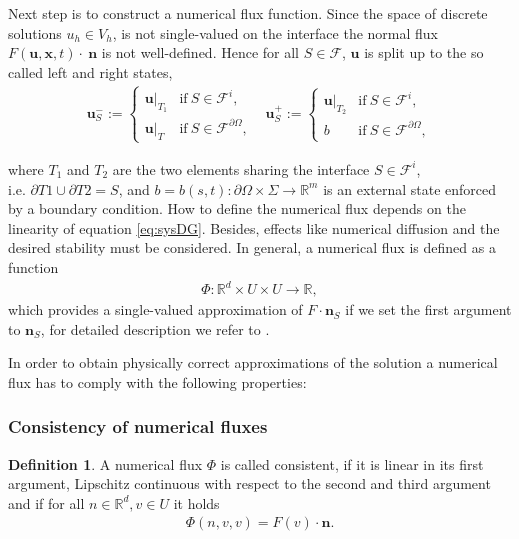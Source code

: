 \documentclass[a4paper,12pt]{article}
\theoremstyle{definition}
\newtheorem{Def}{Definition}
\theoremstyle{definition}
\begin{document}
Next step is to construct a numerical flux function. Since the space of discrete solutions $u_h\in V_h$, is not single-valued on the interface the normal flux $ F(\mathbf{u}, \mathbf{x}, t)\cdot~\mathbf{n} $ is not well-defined.
Hence for all $S \in \mathcal{F}$, $\mathbf{u}$ is split up to the so called left and right states, 
\begin{equation}\label{eq:statesplitting}
\begin{matrix}
\mathbf{u}_S^- := \left\lbrace
\begin{array}{ll}
\mathbf{u}\vert_{T_1} & \mathrm{if}\ S \in \mathcal{F}^i, \\
\mathbf{u}\vert_T & \mathrm{if}\ S \in \mathcal{F}^{\partial \Omega},
\end{array} \right.
& \mathbf{u}_S^+ := \left\lbrace
\begin{array}{ll}
\mathbf{u}\vert_{T_2} & \mathrm{if}\ S \in \mathcal{F}^i, \\
b & \mathrm{if}\ S \in \mathcal{F}^{\partial \Omega},
\end{array}\right.
\end{matrix}
\end{equation}

where $T_1$ and $T_2$ are the two elements sharing the interface $S \in \mathcal{F}^i$,\\ i.e. \mbox{$\partial T1 \cup \partial T2 = S$},  and \mbox{$b=b(s,t):\partial\Omega\times\Sigma\rightarrow \mathbb{R}^m $} is an external state enforced by a boundary condition.
How to define the numerical flux depends on the linearity of equation \eqref{eq:sysDG}. Besides, effects like numerical diffusion and the desired stability must be considered.
In general, a numerical flux is defined as a function
\begin{align}
\Phi :  \mathbb{R}^d \times U \times U \rightarrow \mathbb{R},
\end{align}
which provides a single-valued approximation of $F \cdot \mathbf{n}_S$ if we set the first argument to $\mathbf{n}_S$, for detailed description we refer to \cite{DiPietro}.

In order to obtain physically correct approximations of the solution a numerical flux has to comply with the following properties:

\subsubsection*{Consistency of numerical fluxes}
\begin{Def}\label{def:flux:consistency}
	A numerical flux $\Phi$ is called consistent, if it is linear in its first argument, Lipschitz continuous with respect to the second and third argument and if for all $n\in \mathbb{R}^d, v\in U$ it holds
	\begin{align}
	\Phi(n,v,v) = F(v)\cdot \mathbf{n}.
	\end{align}
\end{Def}
\end{document}
